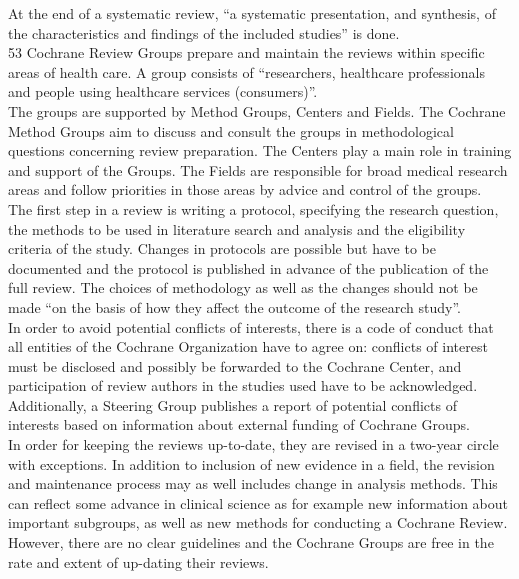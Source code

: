 \documentclass[11pt,a4paper,twoside]{book}\usepackage[]{graphicx}\usepackage[]{color}
\begin{document}
At the end of a systematic review, ``a systematic presentation, and synthesis, of the characteristics and findings of the included studies'' is done. \\
53 Cochrane Review Groups prepare and maintain the reviews within specific areas of health care. A group consists of ``researchers, healthcare professionals and people using healthcare services (consumers)''. \\
The groups are supported by Method Groups, Centers and Fields. The Cochrane Method Groups aim to discuss and consult the groups in methodological questions concerning review preparation. The Centers play a main role in training and support of the Groups. The Fields are responsible for broad medical research areas and follow priorities in those areas by advice and control of the groups. \\
The first step in a review is writing a protocol, specifying the research question, the methods to be used in literature search and analysis and the eligibility criteria of the study. Changes in protocols are possible but have to be documented and the protocol is published in advance of the publication of the full review. The choices of methodology as well as the changes should not be made ``on the basis of how they affect the outcome of the research study''. \\
In order to avoid potential conflicts of interests, there is a code of conduct that all entities of the Cochrane Organization have to agree on: conflicts of interest must be disclosed and possibly be forwarded to the Cochrane Center, and participation of review authors in the studies used have to be acknowledged. Additionally, a Steering Group publishes a report of potential conflicts of interests based on information about external funding of Cochrane Groups. \\
In order for keeping the reviews up-to-date, they are revised in a two-year circle with exceptions. In addition to inclusion of new evidence in a field, the revision and maintenance process may as well includes change in analysis methods. This can reflect some advance in clinical science as for example new information about important subgroups, as well as new methods for conducting a Cochrane Review. However, there are no clear guidelines and the Cochrane Groups are free in the rate and extent of up-dating their reviews.
\end{document}

